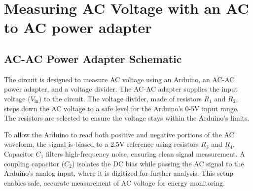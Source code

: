 \section{Measuring AC Voltage with an AC to AC power adapter}


\subsection{AC-AC Power Adapter Schematic}
The circuit is designed to measure AC voltage using an Arduino, an AC-AC power adapter, and a voltage divider. The AC-AC adapter supplies the input voltage (\(V_{\text{in}}\)) to the circuit. The voltage divider, made of resistors \(R_1\) and \(R_2\), steps down the AC voltage to a safe level for the Arduino’s 0-5V input range. The resistors are selected to ensure the voltage stays within the Arduino’s limits.

To allow the Arduino to read both positive and negative portions of the AC waveform, the signal is biased to a 2.5V reference using resistors \(R_3\) and \(R_4\). Capacitor \(C_1\) filters high-frequency noise, ensuring clean signal measurement. A coupling capacitor (\(C_2\)) isolates the DC bias while passing the AC signal to the Arduino’s analog input, where it is digitized for further analysis. This setup enables safe, accurate measurement of AC voltage for energy monitoring.



